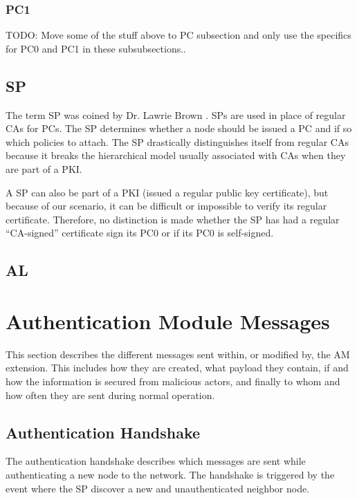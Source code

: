 \subsubsection*{\acf{PC1}}
TODO: Move some of the stuff above to PC subsection and only use the specifics
for PC0 and PC1 in these subsubsections..

\subsection{\acf{SP}}
The term \acl{SP} was coined by Dr. Lawrie Brown \cite{lawrie:technotes}.
\acp{SP} are used in place of regular \acp{CA} for \acp{PC}. The \ac{SP}
determines whether a node should be issued a \ac{PC} and if so which policies to
attach. The \ac{SP} drastically distinguishes itself from regular \acp{CA}
because it breaks the hierarchical model usually associated with \acp{CA} when
they are part of a \ac{PKI}.

A \ac{SP} can also be part of a \ac{PKI} (issued a regular public key
certificate), but because of our scenario, it can be difficult or impossible to
verify its regular certificate. Therefore, no distinction is made whether the
\ac{SP} has had a regular ``\ac{CA}-signed'' certificate sign its \ac{PC0} or if
its \ac{PC0} is self-signed.


\subsection{\acf{AL}}


\section{Authentication Module Messages}
\label{sect:am_messages}
This section describes the different messages sent within, or modified by, the
\ac{AM} extension. This includes how they are created, what payload they
contain, if and how the information is secured from malicious actors, and
finally to whom and how often they are sent during normal operation.

\subsection{Authentication Handshake}
The authentication handshake describes which messages are sent while
authenticating a new node to the network. The handshake is triggered by the
event where the \ac{SP} discover a new and unauthenticated neighbor node.

